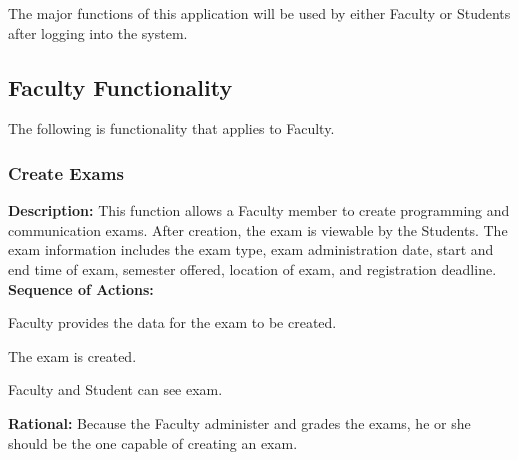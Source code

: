 

The major functions of this application will be used by either Faculty or Students
after logging into the system.

\subsection{Faculty Functionality}
The following is functionality that applies to Faculty.

   \subsubsection{\large Create Exams} 
   \begin{boxed} %
      \textbf{Description:}
      {\small This function allows a Faculty member to create programming and
         communication exams. After creation, the exam is viewable by the
         Students. The exam information includes the exam type, exam
         administration date, start and end time of exam, semester offered,
         location of exam, and registration deadline.} \\

      \textbf{Sequence of Actions:}
      \begin{enumerate}
            {\small
         \item Faculty provides the data for the exam to be created.
         \item The exam is created.
         \item Faculty and Student can see exam.}
      \end{enumerate}

      \textbf{Rational:}
      {\small Because the Faculty administer and grades the exams, he or she should
      be the one capable of creating an exam.}
   \end{boxed} %


